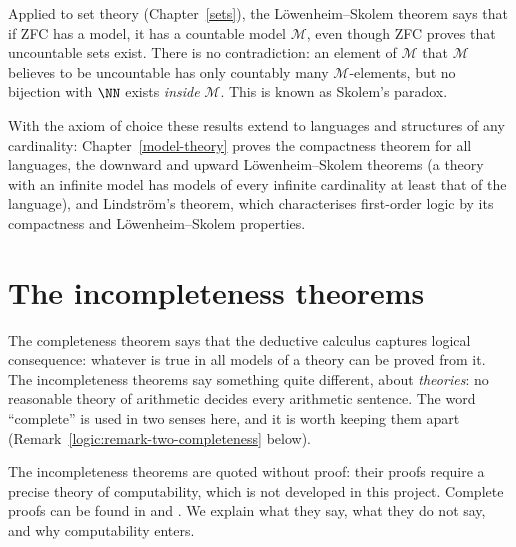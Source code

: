 \begin{remark}\label{logic:remark-skolem-paradox}
Applied to set theory (Chapter~\ref{sets}), the L\"owenheim--Skolem theorem
says that if ZFC has a model, it has a countable model $\mathcal{M}$, even
though ZFC proves that uncountable sets exist. There is no contradiction: an
element of $\mathcal{M}$ that $\mathcal{M}$ believes to be uncountable has
only countably many $\mathcal{M}$-elements, but no bijection with $\NN$ exists
\emph{inside} $\mathcal{M}$. This is known as Skolem's paradox.
\end{remark}

\begin{remark}\label{logic:remark-model-theory}
With the axiom of choice these results extend to languages and structures of any cardinality: Chapter~\ref{model-theory}
proves the compactness theorem for all languages, the downward and upward L\"owenheim--Skolem theorems (a theory with an
infinite model has models of every infinite cardinality at least that of the language), and Lindstr\"om's theorem, which
characterises first-order logic by its compactness and L\"owenheim--Skolem properties.
\end{remark}

\section{The incompleteness theorems}\label{logic:section-incompleteness}

The completeness theorem says that the deductive calculus captures logical consequence: whatever is true in all models of a theory can be proved from it. The
incompleteness theorems say something quite different, about \emph{theories}: no reasonable theory of arithmetic decides every arithmetic sentence. The word ``complete'' is
used in two senses here, and it is worth keeping them apart (Remark~\ref{logic:remark-two-completeness} below).

The incompleteness theorems are quoted without proof: their proofs require a precise theory of computability, which is not developed in this project. Complete proofs can be
found in \cite{smith-godel} and \cite[Chapter 6]{shoenfield-logic}. We explain what they say, what they do not say, and why computability enters.

